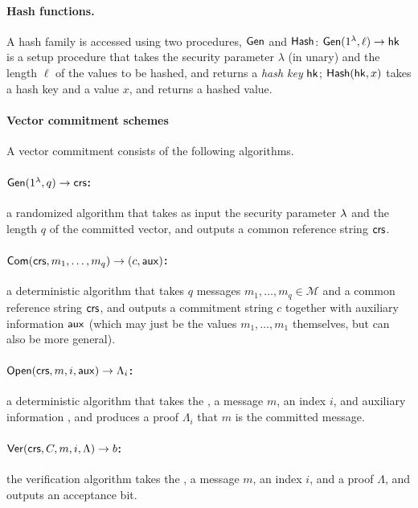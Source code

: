 \paragraph{Hash functions.}
A hash family is accessed using two procedures, $\mathsf{Gen}$ and $\mathsf{Hash}$:
$\mathsf{Gen}(1^\lambda, \ell)\rightarrow \mathsf{hk}$ is a setup procedure that takes the security parameter $\lambda$
(in unary) and the length $\ell$ of the values to be hashed, and returns a \emph{hash key} $\mathsf{hk}$;
$\mathsf{Hash}(\mathsf{hk}, x)$ takes a hash key and a value $x$, and returns a hashed value.

\paragraph{Vector commitment schemes}
A vector commitment consists of the following algorithms.

\vspace{-1ex}
\paragraph{$\mathsf{Gen}(1^\lambda, q)\to \mathsf{crs}$:} a randomized algorithm that takes as input the security parameter $\lambda$ and the length $q$ of the committed vector, and outputs a common reference string $\mathsf{crs}$.
\vspace{-1ex}
\paragraph{$\mathsf{Com}(\mathsf{crs}, m_1,\ldots , m_q)\to (c,\mathsf{aux})$:} a deterministic algorithm that takes $q$ messages $m_1,\ldots, m_q\in \mathcal{M}$ and a common reference string $\mathsf{crs}$, and outputs a commitment string $c$ together with auxiliary information $\mathsf{aux}$
(which may just be the values $m_1,\ldots,m_1$ themselves, but can also be more general).
\vspace{-4ex}
\paragraph{$\mathsf{Open}(\mathsf{crs}, m, i, \mathsf{aux})\to \Lambda_i$:} a deterministic algorithm that takes the \crs, a message $m$, an index $i$, and auxiliary information \aux,
and produces a proof $\Lambda_i$ that $m$ is the \ith committed message.
\vspace{-1ex}
\paragraph{$\mathsf{Ver}(\mathsf{crs}, C, m, i, \Lambda)\to b$:} the verification algorithm takes the \crs, a message $m$, an index $i$, and a proof $\Lambda$, and outputs an acceptance bit.
%

